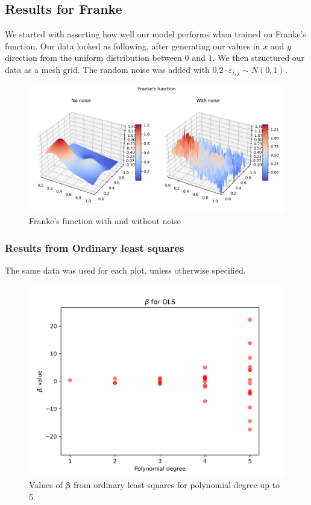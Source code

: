 \documentclass{article}
\begin{document}
\subsection{Results for Franke}
We started with asserting how well our model performs when trained on Franke's function. Our data looked as following, after generating our values in $x$ and $y$ direction from the uniform distribution between $0$ and $1$. We then structured our data as a mesh grid. The random noise was added with $0.2 \cdot \varepsilon_{i,j} \sim N(0, 1)$.
\begin{figure}[htbp]
    \centering
    \includegraphics[width=\textwidth]{Franke/FrankesFunction.png}
    \caption{Franke's function with and without noise}
    \label{fig:FrankeTerrain}
\end{figure}

\newpage
\subsubsection{Results from Ordinary least squares}
The same data was used for each plot, unless otherwise specified.
\begin{figure}[htbp]
    \centering
    \includegraphics[width=\textwidth*2/3]{Franke/OLS_5_betas.png}
    \caption{Values of $\boldsymbol{\beta}$ from ordinary least squares for polynomial degree up to 5.}
    \label{fig:OLS5Beta}
\end{figure}
\end{document}
